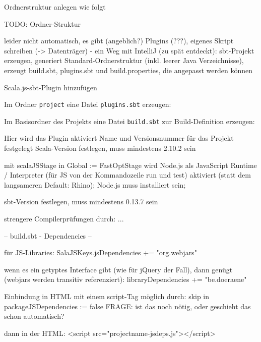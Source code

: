 \documentclass[a4paper, 12pt, hidelinks, listof=totoc, listoftables=totoc, bibliography=totoc]{scrreprt}
\begin{document}
Ordnerstruktur anlegen wie folgt

TODO: Ordner-Struktur

leider nicht automatisch, es gibt (angeblich?) Plugins (???), eigenes Skript schreiben (-> Datenträger)
	- ein Weg mit IntelliJ (zu spät entdeckt): sbt-Projekt erzeugen, generiert Standard-Ordnerstruktur (inkl. leerer Java Verzeichnisse), erzeugt build.sbt, plugins.sbt und build.properties, die angepasst werden können


Scala.js-sbt-Plugin hinzufügen

Im Ordner \texttt{project} eine Datei \texttt{plugins.sbt} erzeugen:


Im Basisordner des Projekts eine Datei \texttt{build.sbt} zur Build-Definition erzeugen:


Hier wird das Plugin aktiviert
Name und Versionsnummer für das Projekt festgelegt
Scala-Version festlegen, muss mindestens 2.10.2 sein

mit scalaJSStage in Global := FastOptStage wird Node.js als JavaScript Runtime / Interpreter (für JS von der Kommandozeile run und test) aktiviert (statt dem langsameren Default: Rhino); Node.js muss installiert sein;


sbt-Version festlegen, muss mindestens 0.13.7 sein


strengere Compilerprüfungen durch: ...


-- build.sbt - Dependencies --

für JS-Libraries:
SalaJSKeys.jsDependencies += "org.webjars" %

wenn es ein getyptes Interface gibt (wie für jQuery der Fall), dann genügt (webjars werden transitiv referenziert):
libraryDependencies += "be.doeraene" %

Einbindung in HTML mit einem script-Tag möglich durch:
skip in packageJSDependencies := false
FRAGE: ist das noch nötig, oder geschieht das schon automatisch?

dann in der HTML:
<script src="projectname-jsdeps.js"></script>
\end{document}

